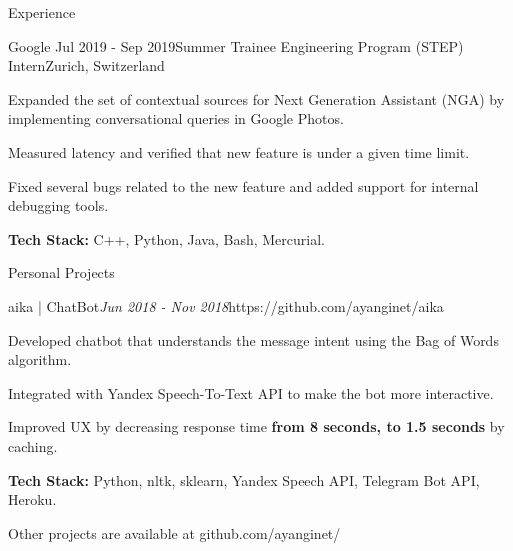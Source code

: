 \documentclass{resume} %
\begin{document}
\begin{rSection}{Experience}
\begin{rSubsection}{Google}{ Jul 2019 - Sep 2019}{Summer Trainee Engineering Program (STEP) Intern}{Zurich, Switzerland}
\item Expanded the set of contextual sources for Next Generation Assistant (NGA) by implementing conversational queries in Google Photos.
\item Measured latency and verified that new feature is under a given time limit.
\item Fixed several bugs related to the new feature and added support for internal debugging tools.
\item \textbf{Tech Stack:} C++, Python, Java, Bash, Mercurial.
\end{rSubsection}

\end{rSection}


\begin{rSection}{Personal Projects}

\begin{rSubsection} {aika | ChatBot}{\em Jun 2018 - Nov 2018}{https://github.com/ayanginet/aika}

\item Developed chatbot that understands the message intent using the Bag of Words algorithm.
\item Integrated with Yandex Speech-To-Text API to make the bot more interactive.
\item Improved UX by decreasing response time \textbf{from 8 seconds, to 1.5 seconds} by caching.
\item \textbf{Tech Stack:} Python, nltk, sklearn, Yandex Speech API, Telegram Bot API, Heroku.
\end{rSubsection}
Other projects are available at github.com/ayanginet/
\end{rSection}

\end{document}
